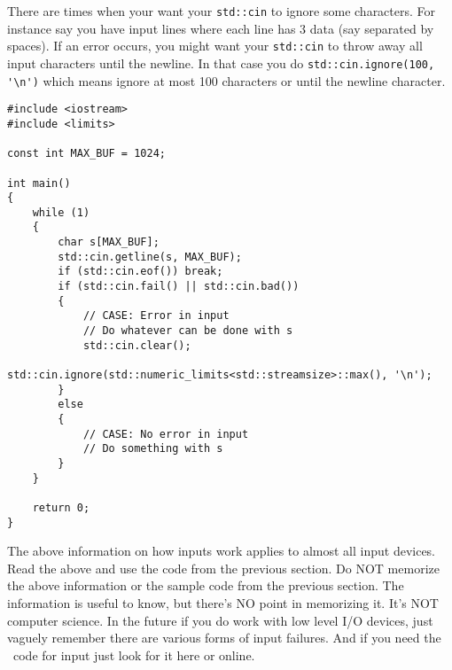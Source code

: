 There are times when your want your
\verb!std::cin! to ignore some characters.
For instance say you have input lines where
each line has 3 data (say separated by spaces).
If an error occurs, you might want your
\verb!std::cin! to throw away all input characters
until the newline.
In that case you do
\verb!std::cin.ignore(100, '\n')!
which means ignore at most 100 characters or until the newline character.

\begin{Verbatim}[frame=single,fontsize=\small]
#include <iostream> 
#include <limits> 

const int MAX_BUF = 1024; 

int main() 
{ 
    while (1) 
    { 
        char s[MAX_BUF]; 
        std::cin.getline(s, MAX_BUF);
        if (std::cin.eof()) break;         
        if (std::cin.fail() || std::cin.bad()) 
        {
            // CASE: Error in input
            // Do whatever can be done with s
            std::cin.clear(); 
            std::cin.ignore(std::numeric_limits<std::streamsize>::max(), '\n');
        }
        else
        {
            // CASE: No error in input
            // Do something with s
        }
    }

    return 0;
} 
  \end{Verbatim}

The above information on how inputs work applies to almost
all input devices.
Read the above and use the code from the previous section.
Do NOT memorize the above information or the sample code from the previous
section.
The information is useful to know, but there's NO point in memorizing it.
It's NOT computer science.
In the future if you do work with low level I/O devices, just vaguely
remember there are various forms of input failures.
And if you need the \cpp\ code for input just look for it here or online.
